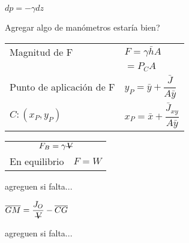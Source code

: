 \documentclass[11pt,a4paper]{article}
\newcommand{\vdes}{\st{\textsl{V}}}
\begin{document}
	
	\begin{multicols}{2}
		\begin{cajita}
			\vspace{.1cm}
			
			$dp = -\gamma dz$
			
			Agregar algo de manómetros estaría bien?
		\end{cajita}
	
		\begin{cajita}
			\vspace{.1cm}
			
			\begin{tabular}{l l}
				Magnitud de F & $F = \gamma \bar{h} A$\\ & \hspace{.2cm} $= P_C A$\\
				Punto de aplicación de F & $ y_P = \bar{y} + \dfrac{\bar{J}}{A \bar{y}}$\\
				$C:(x_P, y_P)$& $x_P = \bar{x} + \dfrac{\bar{J}_{xy}}{A \bar{y}}$\\
			\end{tabular}
		\end{cajita}
	
		\begin{cajita}
			\vspace{.1cm}
			
			\begin{tabular}{l l}
				\multicolumn{2}{c}{$F_B = \gamma \vdes$}\\
				En equilibrio & $F=W$\\
			\end{tabular}
		agreguen si falta...
		\end{cajita}
	
		\begin{cajita}
			\vspace{.1cm}
			
			
			$\overline{GM} = \dfrac{J_O}{\vdes} - \overline{CG}$
			
			
			agreguen si falta...
		\end{cajita}
	\end{multicols}	
			
			
\end{document}
